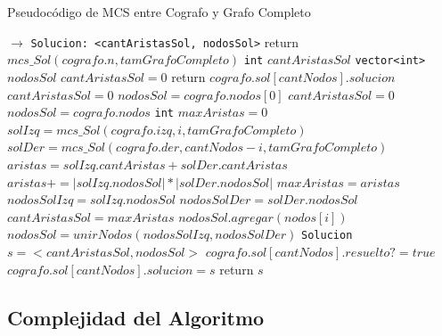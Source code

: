 \begin{algorithm}[H]
  \begin{algorithmic}[1]
  \caption{Pseudocódigo de MCS entre Cografo y Grafo Completo}
  \label{algo:3-2}
   $\to$ \texttt{Solucion: <cantAristasSol, nodosSol>}
  		\State return $mcs\_Sol(cografo.n, tamGrafoCompleto)$
  	\Else
  		\State \texttt{int} $cantAristasSol$
  		\State \texttt{vector<int>} $nodosSol$
  			\State $cantAristasSol = 0$
  			\State return $cografo.sol[cantNodos].solucion$
  			\State $cantAristasSol = 0$
  			\State $nodosSol = cografo.nodos[0]$
  			\State $cantAristasSol = 0$
  			\State $nodosSol = cografo.nodos$
  		\Else
  			\State \texttt{int} $maxAristas = 0$
  				\State $solIzq = mcs\_Sol(cografo.izq, i, tamGrafoCompleto)$
  				\State $solDer = mcs\_Sol(cografo.der, cantNodos-i, tamGrafoCompleto)$
  				\State $aristas = solIzq.cantAristas + solDer.cantAristas$
  					\State $aristas += |solIzq.nodosSol| * |solDer.nodosSol|$
  				\EndIf
  					\State $maxAristas = aristas$ 
  					\State $nodosSolIzq = solIzq.nodosSol$
  					\State $nodosSolDer = solDer.nodosSol$
  				\EndIf
  			\EndFor
  			\State $cantAristasSol = maxAristas$
  				\For { $i \in [0..cantNodos)$ }
  					\State $nodosSol.agregar(nodos[i])$
  				\EndFor
  			\Else
  				\State $nodosSol = unirNodos(nodosSolIzq, nodosSolDer)$
  			\EndIf
  		\EndIf
  		\State \texttt{Solucion} $s = <cantAristasSol, nodosSol>$
  		\State $cografo.sol[cantNodos].resuelto? = true$
  		\State $cografo.sol[cantNodos].solucion = s$
  		\State return $s$
  	\EndIf
  \EndProcedure
  \end{algorithmic}
\end{algorithm}

\subsection{Complejidad del Algoritmo}


